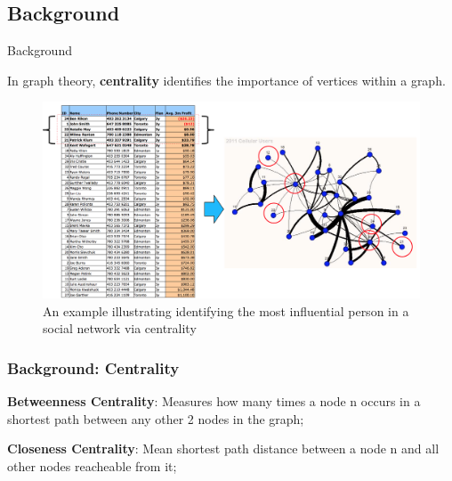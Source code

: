 \documentclass[9pt]{beamer}
\newcommand{\themename}{\textbf{\textsc{metropolis}}\xspace}
\begin{document}
\subsection{Background}
\begin{frame}[fragile]{Background}





In graph theory, \textbf{centrality} identifies the importance of vertices within a graph.
\vspace{-0.11in}
\begin{figure}[H]
\centering
\includegraphics[scale = 0.29]{famous_example.png}
\caption{An example illustrating identifying the most influential person in a social network via centrality}
\end{figure}
\end{frame}

\begin{frame}
\frametitle{Background: Centrality}

\textbf{Betweenness Centrality}: Measures how many times a node n occurs in a shortest path between any other 2 nodes in the graph;

\textbf{Closeness Centrality}: Mean shortest path distance between a node n and all other nodes reacheable from it;

\end{frame}
\end{document}
